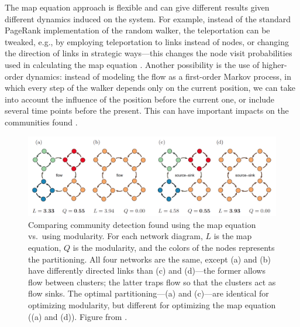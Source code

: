 The map equation approach is flexible and can give different results
given different dynamics induced on the system. For example, instead of
the standard PageRank implementation of the random walker, the
teleportation can be tweaked, e.g., by employing teleportation to links
instead of nodes, or changing the direction of links in strategic
ways---this changes the node visit probabilities used in calculating the
map equation \autocite{lambiotte_ranking_2012}. Another possibility is
the use of higher-order dynamics: instead of modeling the flow as a
first-order Markov process, in which every step of the walker depends
only on the current position, we can take into account the influence of
the position before the current one, or include several time points
before the present. This can have important impacts on the communities
found \autocite{rosvall_memory_2014}.

\begin{figure}
\centering
\includegraphics{img/rosvall2010_fig3_mapvsmodularity.png}
\caption{Comparing community detection found using the map equation
vs.~using modularity. For each network diagram, \(L\) is the map
equation, \(Q\) is the modularity, and the colors of the nodes
represents the partitioning. All four networks are the same, except (a)
and (b) have differently directed links than (c) and (d)---the former
allows flow between clusters; the latter traps flow so that the clusters
act as flow sinks. The optimal partitioning---(a) and (c)---are
identical for optimizing modularity, but different for optimizing the
map equation ((a) and (d)). Figure from
\autocite{rosvall_map_2010}.}\label{fig:mapvsmod}
\end{figure}

